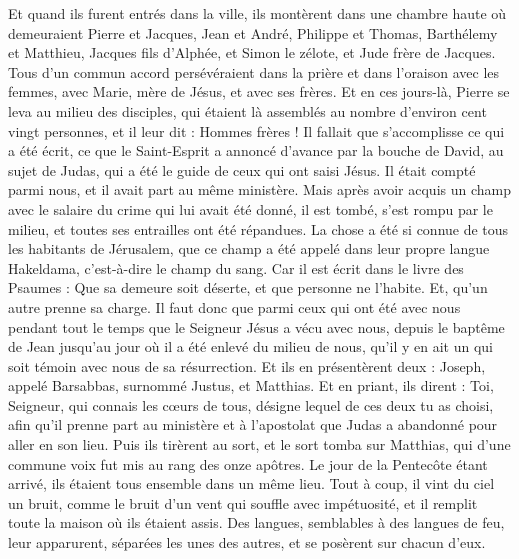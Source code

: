 \begin{multicols}{2}
Et quand ils furent entrés dans la ville, ils montèrent dans une chambre haute où demeuraient Pierre et Jacques, Jean et André, Philippe et Thomas, Barthélemy et Matthieu, Jacques fils d'Alphée, et Simon le zélote, et Jude frère de Jacques.
Tous d’un commun accord persévéraient dans la prière et dans l’oraison avec les femmes, avec Marie, mère de Jésus, et avec ses frères.
Et en ces jours-là, Pierre se leva au milieu des disciples, qui étaient là assemblés au nombre d'environ cent vingt personnes, et il leur dit :
Hommes frères ! Il fallait que s’accomplisse ce qui a été écrit, ce que le Saint-Esprit a annoncé d’avance par la bouche de David, au sujet de Judas, qui a été le guide de ceux qui ont saisi Jésus.
Il était compté parmi nous, et il avait part au même ministère.
Mais après avoir acquis un champ avec le salaire du crime qui lui avait été donné, il est tombé, s’est rompu par le milieu, et toutes ses entrailles ont été répandues.
La chose a été si connue de tous les habitants de Jérusalem, que ce champ a été appelé dans leur propre langue Hakeldama, c'est-à-dire le champ du sang.
Car il est écrit dans le livre des Psaumes : Que sa demeure soit déserte, et que personne ne l’habite. Et, qu'un autre prenne sa charge.
Il faut donc que parmi ceux qui ont été avec nous pendant tout le temps que le Seigneur Jésus a vécu avec nous,
depuis le baptême de Jean jusqu'au jour où il a été enlevé du milieu de nous, qu’il y en ait un qui soit témoin avec nous de sa résurrection.
Et ils en présentèrent deux : Joseph, appelé Barsabbas, surnommé Justus, et Matthias.
Et en priant, ils dirent : Toi, Seigneur, qui connais les cœurs de tous, désigne lequel de ces deux tu as choisi,
afin qu'il prenne part au ministère et à l’apostolat que Judas a abandonné pour aller en son lieu.
Puis ils tirèrent au sort, et le sort tomba sur Matthias, qui d'une commune voix fut mis au rang des onze apôtres.
\VerseOne{}Le jour de la Pentecôte étant arrivé, ils étaient tous ensemble dans un même lieu.
Tout à coup, il vint du ciel un bruit, comme le bruit d'un vent qui souffle avec impétuosité, et il remplit toute la maison où ils étaient assis.
Des langues, semblables à des langues de feu, leur apparurent, séparées les unes des autres, et se posèrent sur chacun d’eux.

\end{multicols}
